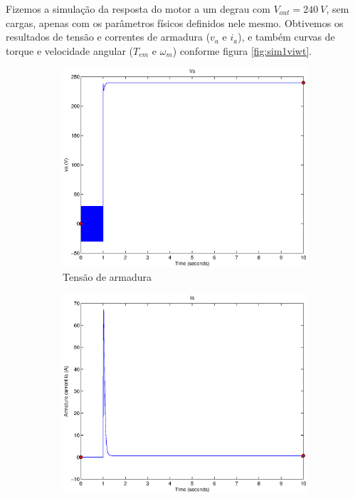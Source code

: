 \documentclass{article}
\begin{document}
Fizemos a simulação da resposta do motor a um degrau com $V_{out}=240\ V$, sem cargas, apenas com os parâmetros físicos definidos nele mesmo.
Obtivemos os resultados de tensão e correntes de armadura ($v_a$ e $i_a$), e também curvas de torque e velocidade angular ($T_{em}$ e $\omega_m$) conforme figura \ref{fig:sim1viwt}.

\begin{figure}[H]
	\centering
	\begin{subfigure}{0.45\textwidth}
		\includegraphics[width=\linewidth]{matlab/va1}
		\caption{Tensão de armadura}
	\end{subfigure}
	\begin{subfigure}{0.45\textwidth}
		\includegraphics[width=\linewidth]{matlab/ia1}

\end{subfigure}
\end{figure}
\end{document}

